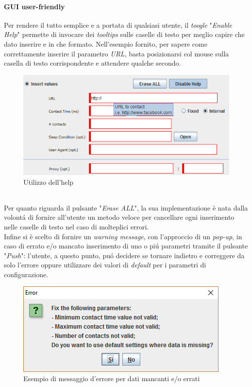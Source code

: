 \paragraph{GUI user-friendly}
Per rendere il tutto semplice e a portata di qualsiasi utente, il \textit{toogle} "\textit{Enable Help}" permette di invocare dei \textit{tooltips} sulle caselle di testo per meglio capire che dato inserire e in che formato. Nell'esempio fornito, per sapere come correttamente inserire il parametro \textit{URL}, basta posizionarsi col mouse sulla casella di testo corrispondente e attendere qualche secondo.
\begin{figure}[!htb]
        \centering        
        \includegraphics[width=0.7\linewidth]{./imgs/help}
        \caption{Utilizzo dell'help}
        \label{help}
\end{figure}
\\Per quanto riguarda il pulsante "\textit{Erase ALL}", la sua implementazione \`e nata dalla volont\'a di fornire all'utente un metodo veloce per cancellare ogni inserimento nelle caselle di testo nel caso di molteplici errori.\\
Infine si \`e scelto di fornire un \textit{warning message}, con l'approccio di un \textit{pop-up}, in caso di errato e/o mancato inserimento di uno o pi\'u parametri tramite il pulsante "\textit{Push}": l'utente, a questo punto, pu\'o decidere se tornare indietro e correggere da solo l'errore oppure utilizzare dei valori di \textit{default} per i parametri di configurazione.
\begin{figure}[!htb]
        \centering        
        \includegraphics[width=0.6\linewidth]{./imgs/warning}
        \caption{Esempio di messaggio d'errore per dati mancanti e/o errati}
        \label{warningMessage}
\end{figure}

